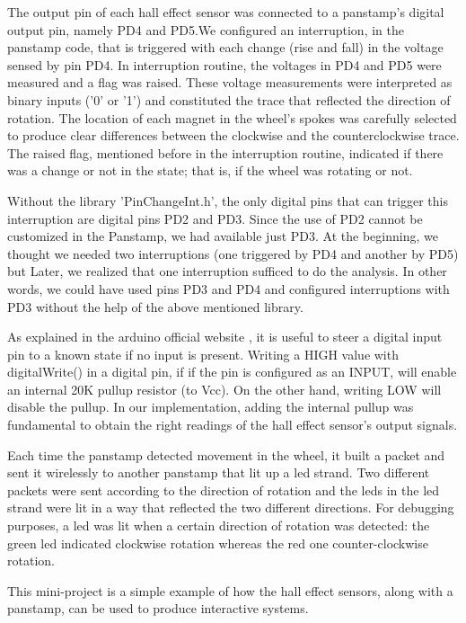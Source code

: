 The output pin of each hall effect sensor was connected to a panstamp's digital output pin, namely PD4 and PD5.We configured an interruption, in the panstamp code, that is triggered with each change (rise and fall) in the voltage sensed by pin PD4. In interruption routine, the voltages in PD4 and PD5 were measured and a flag was raised. These voltage measurements were interpreted as binary inputs ('0' or '1') and constituted the trace that reflected the direction of rotation. The location of each magnet in the wheel's spokes was carefully selected to produce clear differences between the clockwise and the counterclockwise trace. The raised flag, mentioned before in the interruption routine, indicated if there was a change or not in the state; that is, if the wheel was rotating or not.

Without the library 'PinChangeInt.h', the only digital pins that can trigger this interruption are digital pins PD2 and PD3. Since the use of PD2 cannot be customized in the Panstamp, we had available just PD3. At the beginning, we thought we needed two interruptions (one triggered by PD4 and another by PD5) but Later, we realized that one interruption sufficed to do the analysis. 
In other words, we could have used pins PD3 and PD4 and configured interruptions with PD3 without the help of the above mentioned library. 

As explained in the arduino official website \cite{arduino}, it is useful to steer a digital input pin to a known state if no input is present. Writing a HIGH value with digitalWrite() in a digital pin, if if the pin is configured as an INPUT, will enable an internal 20K pullup resistor (to Vcc). On the other hand, writing LOW will disable the pullup. In our implementation, adding the internal pullup was fundamental to obtain the right readings of the hall effect sensor's output signals. 

Each time the panstamp detected movement in the wheel, it built a packet and sent it wirelessly to another panstamp that lit up a led strand. Two different packets were sent according to the direction of rotation and the leds in the led strand were lit in a way that reflected the two different directions. For debugging purposes, a led was lit when a certain direction of rotation was detected: the green led indicated clockwise rotation whereas the red one counter-clockwise rotation. 

This mini-project is a simple example of how the hall effect sensors, along with a panstamp, can be used to produce interactive systems. 








